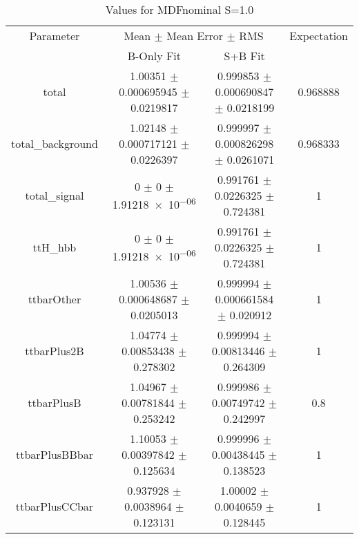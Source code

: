 \begin{table}
\centering
\caption{Values for MDFnominal S=1.0}
\begin{tabular}{cccc}
\toprule
Parameter & \multicolumn{2}{c}{Mean $\pm$ Mean Error $\pm$ RMS} & Expectation\\
 & B-Only Fit & S+B Fit & \\
\midrule
total & \num{1.00351} $\pm$ \num{0.000695945} $\pm$ \num{0.0219817} & \num{0.999853} $\pm$ \num{0.000690847} $\pm$ \num{0.0218199} & \num{0.968888}\\
total\_background & \num{1.02148} $\pm$ \num{0.000717121} $\pm$ \num{0.0226397} & \num{0.999997} $\pm$ \num{0.000826298} $\pm$ \num{0.0261071} & \num{0.968333}\\
total\_signal & \num{0} $\pm$ \num{0} $\pm$ \num{1.91218e-06} & \num{0.991761} $\pm$ \num{0.0226325} $\pm$ \num{0.724381} & \num{1}\\
ttH\_hbb & \num{0} $\pm$ \num{0} $\pm$ \num{1.91218e-06} & \num{0.991761} $\pm$ \num{0.0226325} $\pm$ \num{0.724381} & \num{1}\\
ttbarOther & \num{1.00536} $\pm$ \num{0.000648687} $\pm$ \num{0.0205013} & \num{0.999994} $\pm$ \num{0.000661584} $\pm$ \num{0.020912} & \num{1}\\
ttbarPlus2B & \num{1.04774} $\pm$ \num{0.00853438} $\pm$ \num{0.278302} & \num{0.999994} $\pm$ \num{0.00813446} $\pm$ \num{0.264309} & \num{1}\\
ttbarPlusB & \num{1.04967} $\pm$ \num{0.00781844} $\pm$ \num{0.253242} & \num{0.999986} $\pm$ \num{0.00749742} $\pm$ \num{0.242997} & \num{0.8}\\
ttbarPlusBBbar & \num{1.10053} $\pm$ \num{0.00397842} $\pm$ \num{0.125634} & \num{0.999996} $\pm$ \num{0.00438445} $\pm$ \num{0.138523} & \num{1}\\
ttbarPlusCCbar & \num{0.937928} $\pm$ \num{0.0038964} $\pm$ \num{0.123131} & \num{1.00002} $\pm$ \num{0.0040659} $\pm$ \num{0.128445} & \num{1}\\
\bottomrule
\end{tabular}
\end{table}